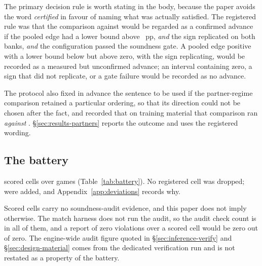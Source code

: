 The primary decision rule is worth stating in the body, because the paper avoids the word
\emph{certified} in favour of naming what was actually satisfied. The registered rule was that the
comparison against \fcheap{} would be regarded as a confirmed advance if the pooled edge had a lower
bound above \vsevenPrimaryFloor{}~pp, \emph{and} the sign replicated on both banks, \emph{and} the
configuration passed the soundness gate. A pooled edge positive with a lower bound below
\vsevenPrimaryFloor{} but above zero, with the sign replicating, would be recorded as a measured but
unconfirmed advance; an interval containing zero, a sign that did not replicate, or a gate failure
would be recorded as no advance.

The protocol also fixed in advance the sentence to be used if the partner-regime comparison retained
a particular ordering, so that its direction could not be chosen after the fact, and recorded that on
training material that comparison ran \emph{against} \sestina{}. \S\ref{sec:results-partners}
reports the outcome and uses the registered wording.

\subsection{The battery}
\label{sec:design-battery}

\vsevenScoredCells{} scored cells over \vsevenScoredGames{} games (Table~\ref{tab:battery}). No registered cell was dropped;
\vsevenCellsAdded{} were added, and Appendix~\ref{app:deviations} records why.

\begin{table}[!ht]\centering
\caption{Every registered battery against what was measured. \emph{Registered} is the count the
protocol names, not the count that ran: two deviations add a reference cell and sixteen control cells,
because without them three of the protocol's own questions are not computable from the cells it
lists.}
\label{tab:battery}
{\tabfont}
\end{table}

Scored cells carry no soundness-audit evidence, and this paper does not imply otherwise. The match
harness does not run the audit, so the audit check count is \vsevenAuditChecks{} in all
\vsevenScoredCells{} of them, and a report of zero violations over a scored cell would be zero out of
zero. The engine-wide audit figure quoted in \S\ref{sec:inference-verify} and
\S\ref{sec:design-material} comes from the dedicated verification run and is not restated as a
property of the battery.
